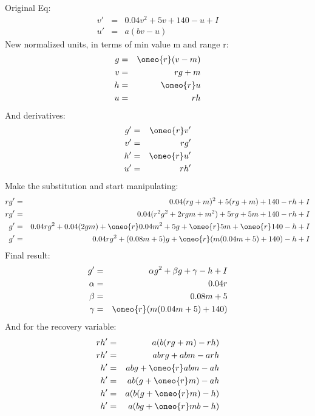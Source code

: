 \documentclass[11pt,twoside]{article}
\begin{document}
Original Eq:
\begin{eqnarray}
  v' & = & 0.04 v^2 + 5v + 140 - u + I \\
  u' & = & a(bv - u)
\end{eqnarray}
New normalized units, in terms of min value m and range r:
\begin{eqnarray}
  g & = & \oneo{r} (v - m)\\
  v & = & r g + m\\
  h & = & \oneo{r} u \\
  u & = & r h
\end{eqnarray}
And derivatives:
\begin{eqnarray}
  g' & = & \oneo{r} v'\\
  v' & = & r g'\\
  h' & = & \oneo{r} u'\\
  u' & = & r h'\\
\end{eqnarray}
Make the substitution and start manipulating:
\begin{eqnarray}
  r g' & = & 0.04 (rg + m)^2 + 5 (rg + m) + 140 - rh + I \\
  r g' & = & 0.04 (r^2g^2 + 2rgm + m^2) + 5rg + 5m + 140 - rh + I \\
  g' & = & 0.04 rg^2 + 0.04 (2gm) + \oneo{r} 0.04 m^2 + 5g + \oneo{r} 5m + \oneo{r} 140 - h + I \\
  g' & = & 0.04 rg^2 + (0.08 m + 5)g + \oneo{r} (m(0.04 m + 5) + 140) - h + I
\end{eqnarray}
Final result:
\begin{eqnarray}
  g' & = & \alpha g^2 + \beta g + \gamma - h + I \\
  \alpha & = & 0.04 r \\
  \beta & = & 0.08 m + 5\\
  \gamma & = & \oneo{r} (m(0.04 m + 5) + 140)
\end{eqnarray}
And for the recovery variable:
\begin{eqnarray}
  r h' & = & a(b(rg + m) - rh)\\
  r h' & = & abrg + abm - arh\\
  h' & = & abg + \oneo{r}abm - ah\\
  h' & = & ab(g + \oneo{r}m) - ah\\
  h' & = & a(b(g + \oneo{r}m) - h)\\
  h' & = & a(bg + \oneo{r}mb - h)
\end{eqnarray}


\end{document}
